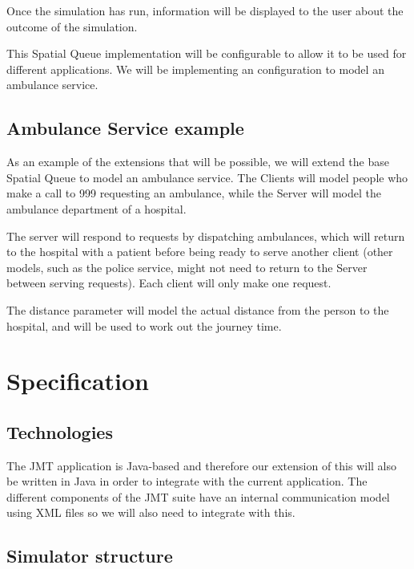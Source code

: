 \documentclass[a4paper]{article}
\begin{document}
Once the simulation has run, information will be displayed to the user about the outcome of the simulation.

This Spatial Queue implementation will be configurable to allow it to be used for different applications. We will be implementing an configuration to model an ambulance service.

\subsection{Ambulance Service example}%

As an example of the extensions that will be possible, we will extend the base Spatial Queue to model an ambulance service. The Clients will model people who make a call to 999 requesting an ambulance, while the Server will model the ambulance department of a hospital.

The server will respond to requests by dispatching ambulances, which will return to the hospital with a patient before being ready to serve another client (other models, such as the police service, might not need to return to the Server between serving requests). Each client will only make one request.

The distance parameter will model the actual distance from the person to the hospital, and will be used to work out the journey time.

\newpage
\section{Specification}

\subsection{Technologies}%

The JMT application is Java-based and therefore our extension of this will also be written in Java in order to integrate with the current application. The different components of the JMT suite have an internal communication model using XML files so we will also need to integrate with this.

\subsection{Simulator structure}%
\end{document}
